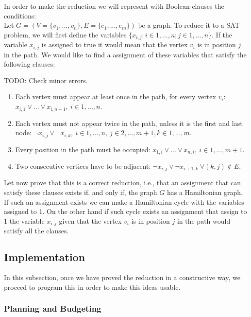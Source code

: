 In order to make the reduction we will represent with Boolean clauses the conditions:\\

Let $G=(V=\{ v_1,...,v_n\},E= \{e_1,...,e_m\})$ be a graph. To reduce it to a SAT problem, we will first define the variables $\{x_{i,j}: i\in 1,...,n ; j\in 1,...,n \}$. If the variable $x_{i,j}$ is assigned to true it would mean that the vertex $v_i$ is in position $j$ in the path. We would like to find a assignment of these variables that satisfy the following clauses:


TODO: Check minor errors.
\begin{enumerate}
\item Each vertex must appear at least once in the path, for every vertex $v_i$:
  $ x_{i,1} \vee ... \vee x_{i,n +1},\ i \in 1,...,n$.
\item Each vertex must not appear twice in the path, unless it is the first and last node: $\neg x_{i,j} \vee \neg x_{i,k},\ i \in 1,...,n ,\ j \in 2,...,m+1, k \in 1,...,m$.
\item Every position in the path must be occupied:   $ x_{1,i} \vee ... \vee x_{n,i},\ i \in 1,...,m+1$.
\item Two consecutive vertices have to be adjacent: $\neg x_{i,j} \vee \neg x_{i+1,k}\ \forall (k,j) \not \in E$.
\end{enumerate}

Let now prove that this is a correct reduction, i.e., that an assignment that can satisfy these clauses exists if, and only if, the graph $G$ has a Hamiltonian graph. If such an assignment exists we can make a Hamiltonian cycle with the variables assigned to 1. On the other hand if such cycle exists an assignment that assign to 1 the variable $x_{i,j}$ given that the vertex $v_i$ is in position $j$ in the path would satisfy all the clauses. 

\subsection{Implementation}

In this subsection, once we have proved the reduction in a constructive way, we proceed to program this in order to make this ideas usable.

\subsubsection{Planning and Budgeting}

